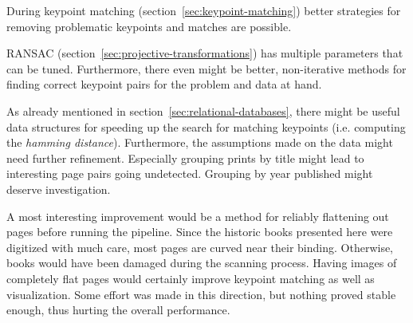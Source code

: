 \documentclass{ltjarticle}
\begin{document}
During keypoint matching (section~\ref{sec:keypoint-matching}) better strategies for removing problematic keypoints and matches are possible.

RANSAC (section~\ref{sec:projective-transformations}) has multiple parameters that can be tuned. Furthermore, there even might be better, non-iterative methods for finding correct keypoint pairs for the problem and data at hand.

As already mentioned in section~\ref{sec:relational-databases}, there might be useful data structures for speeding up the search for matching keypoints (i.e. computing the \emph{hamming distance}). Furthermore, the assumptions made on the data might need further refinement. Especially grouping prints by title might lead to interesting page pairs going undetected. Grouping by year published might deserve investigation.

A most interesting improvement would be a method for reliably flattening out pages before running the pipeline. Since the historic books presented here were digitized with much care, most pages are curved near their binding. Otherwise, books would have been damaged during the scanning process. Having images of completely flat pages would certainly improve keypoint matching as well as visualization. Some effort was made in this direction, but nothing proved stable enough, thus hurting the overall performance.

\printbibliography
\end{document}

